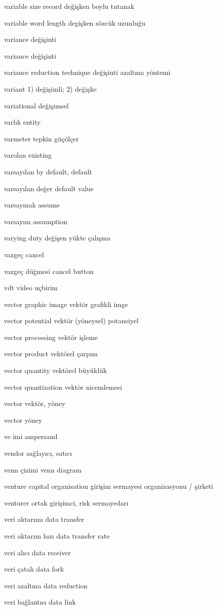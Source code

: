\documentclass[12pt,fleqn]{article}\usepackage{../../common}
\begin{document}
variable size record değişken boylu tutanak

variable word length degişken sözcük uzunluğu

variance değişinti

variance değişinti

variance reduction technique değişinti azaltma yöntemi

variant 1) değişimli; 2) değişke

variational değişimsel

varlık entity

varmeter tepkin güçölçer

varolan existing

varsayılan by default, default

varsayılan değer default value

varsaymak assume

varsayım assumption

varying duty değişen yükte çalışma

vazgeç cancel

vazgeç düğmesi cancel button

vdt video uçbirim

vector graphic image vektör grafikli imge

vector potential vektör (yöneysel) potansiyel

vector processing vektör işleme

vector product vektörel çarpım

vector quantity vektörel büyüklük

vector quantization vektör nicemlemesi

vector vektör, yöney

vector yöney

ve imi ampersand

vendor sağlayıcı, satıcı

venn çizimi venn diagram

venture capital organisation girişim sermayesi organizasyonu / şirketi

venturer ortak girişimci, risk sermayedarı

veri aktarımı data transfer

veri aktarım hızı data transfer rate

veri alıcı data receiver

veri çatalı data fork

veri azaltma data reduction

veri bağlantısı data link
\end{document}
